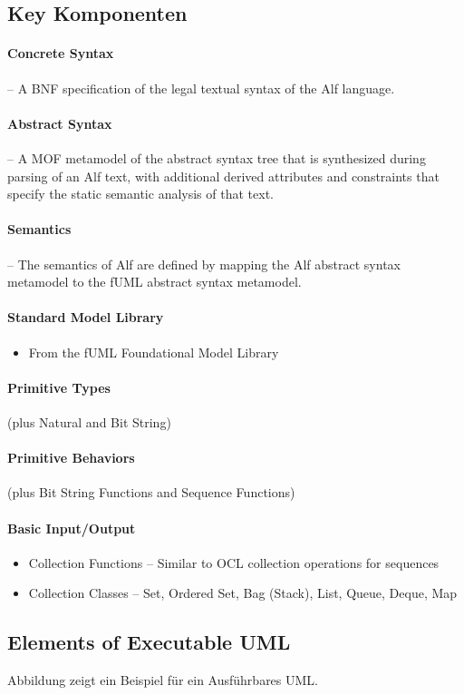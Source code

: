 \subsection{Key Komponenten}

\paragraph{Concrete Syntax} – A BNF specification of the legal textual syntax of the Alf language.

\paragraph{Abstract Syntax} – A MOF metamodel of the abstract syntax tree that is synthesized during parsing of an Alf text, with additional derived attributes and constraints that specify the static semantic analysis of that text.

\paragraph{Semantics} – The semantics of Alf are defined by mapping the Alf abstract syntax metamodel to the fUML abstract syntax metamodel.

\paragraph{Standard Model Library}
\begin{itemize}
\item From the fUML Foundational Model Library
\end{itemize}

\paragraph{Primitive Types} (plus Natural and Bit String)

\paragraph{Primitive Behaviors} (plus Bit String Functions and Sequence Functions)

\paragraph{Basic Input/Output}
\begin{itemize}
\item Collection Functions – Similar to OCL collection operations for sequences
\item Collection Classes – Set, Ordered Set, Bag (Stack), List, Queue, Deque, Map
\end{itemize}

\subsection{Elements of Executable UML}


Abbildung  zeigt ein Beispiel für ein Ausführbares UML.










